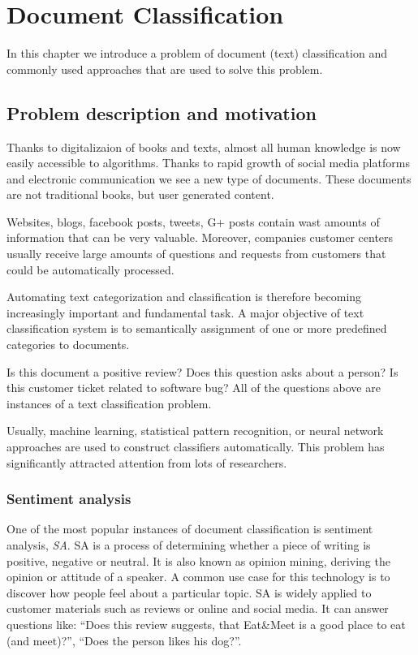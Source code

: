 \chapter{Document Classification}

    In this chapter we introduce a problem of document (text) classification and commonly used approaches that are used to solve this problem.

\section{Problem description and motivation} \label{sec:problem}

    Thanks to digitalizaion of books and texts, almost all human knowledge is now easily accessible to algorithms. 
    Thanks to rapid growth of social media platforms and electronic communication we see a new type of documents.
    These documents are not traditional books, but user generated content.
    
    Websites, blogs, facebook posts, tweets, G+ posts contain wast amounts of information that can be very valuable.
    Moreover, companies customer centers usually receive large amounts of questions and requests from customers that could be automatically processed.
    
    Automating text categorization and classification is therefore becoming increasingly important and fundamental task. 
    A major objective of text classification system is to semantically assignment of one or more predefined categories to documents.
    
    Is this document a positive review? 
    Does this question asks about a person?
    Is this customer ticket related to software bug?
    All of the questions above are instances of a text classification problem.
    
    Usually, machine learning, statistical pattern recognition, or neural network approaches are used to construct classifiers automatically.
    This problem has significantly attracted attention from lots of researchers.

    \subsection{Sentiment analysis}
    
    
    One of the most popular instances of document classification is sentiment analysis, \emph{SA}.
    SA is a process of determining whether a piece of writing is positive, negative or neutral.
    It is also known as opinion mining, deriving the opinion or attitude of a speaker. 
    A common use case for this technology is to discover how people feel about a particular topic.
    SA is widely applied to customer materials such as reviews or online and social media.
    It can answer questions like: ``Does this review suggests, that Eat\&Meet is a good place to eat (and meet)?'', ``Does the person likes his dog?''.
    
